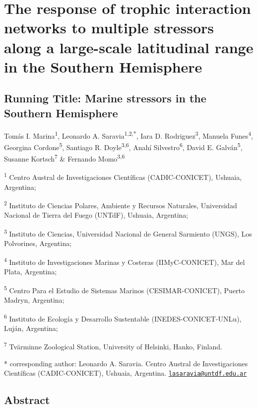 \documentclass[
]{article}
\author{}
\date{\vspace{-2.5em}}
\begin{document}
\section{The response of trophic interaction networks to multiple
stressors along a large-scale latitudinal range in the Southern
Hemisphere}\label{the-response-of-trophic-interaction-networks-to-multiple-stressors-along-a-large-scale-latitudinal-range-in-the-southern-hemisphere}

\subsection{Running Title: Marine stressors in the Southern
Hemisphere}\label{running-title-marine-stressors-in-the-southern-hemisphere}

Tomás I. Marina\textsuperscript{1}, Leonardo A.
Saravia\textsuperscript{1,2,*}, Iara D. Rodriguez\textsuperscript{3},
Manuela Funes\textsuperscript{4}, Georgina Cordone\textsuperscript{5},
Santiago R. Doyle\textsuperscript{3,6}, Anahí
Silvestro\textsuperscript{6}, David E. Galván\textsuperscript{5},
Susanne Kortsch\textsuperscript{7} \& Fernando Momo\textsuperscript{3,6}

\textsuperscript{1} Centro Austral de Investigaciones Científicas
(CADIC-CONICET), Ushuaia, Argentina;

\textsuperscript{2} Instituto de Ciencias Polares, Ambiente y Recursos
Naturales, Universidad Nacional de Tierra del Fuego (UNTdF), Ushuaia,
Argentina;

\textsuperscript{3} Instituto de Ciencias, Universidad Nacional de
General Sarmiento (UNGS), Los Polvorines, Argentina;

\textsuperscript{4} Instituto de Investigaciones Marinas y Costeras
(IIMyC-CONICET), Mar del Plata, Argentina;

\textsuperscript{5} Centro Para el Estudio de Sistemas Marinos
(CESIMAR-CONICET), Puerto Madryn, Argentina;

\textsuperscript{6} Instituto de Ecología y Desarrollo Sustentable
(INEDES-CONICET-UNLu), Luján, Argentina;

\textsuperscript{7} Tvärminne Zoological Station, University of
Helsinki, Hanko, Finland.

* corresponding author: Leonardo A. Saravia. Centro Austral de
Investigaciones Científicas (CADIC-CONICET), Ushuaia, Argentina.
\href{mailto:lasaravia@untdf.edu.ar}{\nolinkurl{lasaravia@untdf.edu.ar}}

\subsection{Abstract}\label{abstract}
\end{document}
